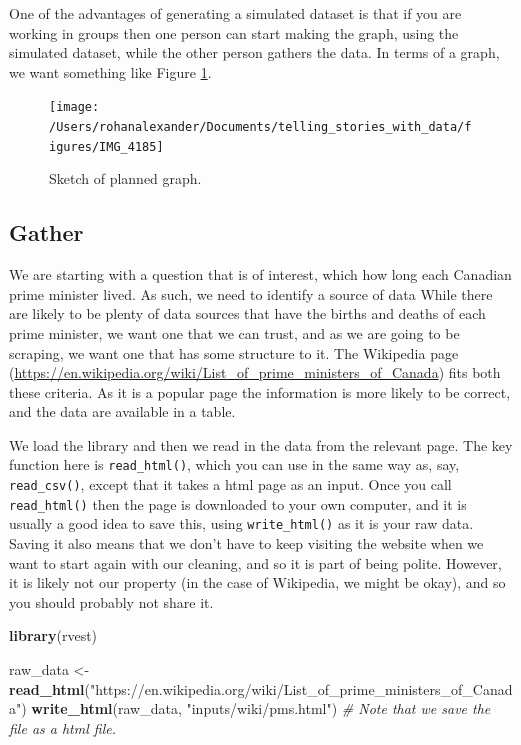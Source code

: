\documentclass[
]{book}
\newenvironment{Shaded}{\begin{snugshade}}{\end{snugshade}}
\newcommand{\CommentTok}[1]{\textcolor[rgb]{0.56,0.35,0.01}{\textit{#1}}}
\newcommand{\KeywordTok}[1]{\textcolor[rgb]{0.13,0.29,0.53}{\textbf{#1}}}
\newcommand{\NormalTok}[1]{#1}
\newcommand{\StringTok}[1]{\textcolor[rgb]{0.31,0.60,0.02}{#1}}
\begin{document}
One of the advantages of generating a simulated dataset is that if you are working in groups then one person can start making the graph, using the simulated dataset, while the other person gathers the data. In terms of a graph, we want something like Figure \ref{fig:pmsgraphexample}.

\begin{figure}
\texttt{[image: /Users/rohanalexander/Documents/telling\_stories\_with\_data/figures/IMG\_4185]} \caption{Sketch of planned graph.}\label{fig:pmsgraphexample}
\end{figure}

\hypertarget{gather-1}{%
\subsection{Gather}\label{gather-1}}

We are starting with a question that is of interest, which how long each Canadian prime minister lived. As such, we need to identify a source of data While there are likely to be plenty of data sources that have the births and deaths of each prime minister, we want one that we can trust, and as we are going to be scraping, we want one that has some structure to it. The Wikipedia page (\url{https://en.wikipedia.org/wiki/List_of_prime_ministers_of_Canada}) fits both these criteria. As it is a popular page the information is more likely to be correct, and the data are available in a table.

We load the library and then we read in the data from the relevant page. The key function here is \texttt{read\_html()}, which you can use in the same way as, say, \texttt{read\_csv()}, except that it takes a html page as an input. Once you call \texttt{read\_html()} then the page is downloaded to your own computer, and it is usually a good idea to save this, using \texttt{write\_html()} as it is your raw data. Saving it also means that we don't have to keep visiting the website when we want to start again with our cleaning, and so it is part of being polite. However, it is likely not our property (in the case of Wikipedia, we might be okay), and so you should probably not share it.

\begin{Shaded}
\begin{Highlighting}[]
\KeywordTok{library}\NormalTok{(rvest)}
\end{Highlighting}
\end{Shaded}

\begin{Shaded}
\begin{Highlighting}[]
\NormalTok{raw_data <-}\StringTok{ }\KeywordTok{read_html}\NormalTok{(}\StringTok{"https://en.wikipedia.org/wiki/List_of_prime_ministers_of_Canada"}\NormalTok{)}
\KeywordTok{write_html}\NormalTok{(raw_data, }\StringTok{"inputs/wiki/pms.html"}\NormalTok{) }\CommentTok{# Note that we save the file as a html file.}
\end{Highlighting}
\end{Shaded}
\end{document}
